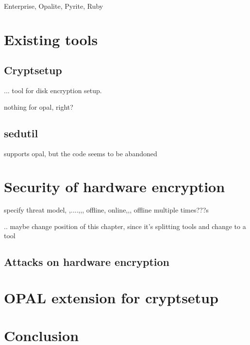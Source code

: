 \documentclass[
  digital, %
  oneside, %
  nolof,     %
  nolot,     %
]{fithesis4}
\begin{document}
Enterprise, Opalite, Pyrite, Ruby

\chapter{Existing tools}

\section{Cryptsetup}

... tool for disk encryption setup.

nothing for opal, right?

\section{sedutil}

supports opal, but the code seems to be abandoned

\chapter{Security of hardware encryption}

specify threat model, ,....,,, offline, online,,, offline multiple times???s

.. maybe change position of this chapter, since it's splitting tools and change to a tool

\section{Attacks on hardware encryption}

\chapter{OPAL extension for cryptsetup}

\chapter{Conclusion}



\printbibliography[heading=bibintoc] %
\end{document}
